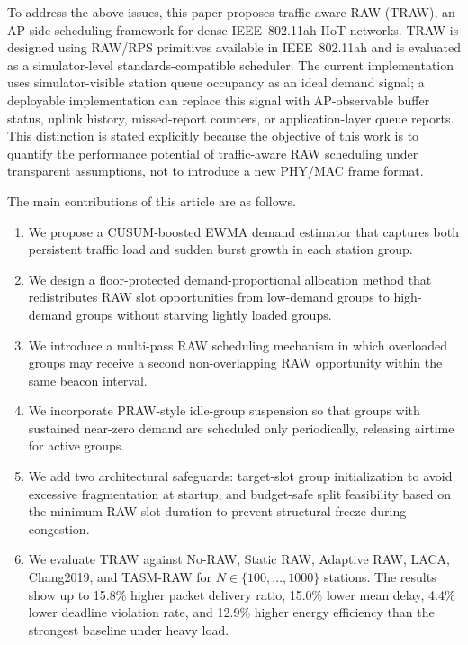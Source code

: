 \documentclass[journal]{IEEEtran}
\begin{document}
To address the above issues, this paper proposes traffic-aware RAW
(TRAW), an AP-side scheduling framework for dense IEEE~802.11ah IIoT
networks. TRAW is designed using RAW/RPS primitives available in
IEEE~802.11ah and is evaluated as a simulator-level standards-compatible
scheduler. The current implementation uses simulator-visible station
queue occupancy as an ideal demand signal; a deployable implementation
can replace this signal with AP-observable buffer status, uplink
history, missed-report counters, or application-layer queue reports.
This distinction is stated explicitly because the objective of this work
is to quantify the performance potential of traffic-aware RAW scheduling
under transparent assumptions, not to introduce a new PHY/MAC frame
format.

The main contributions of this article are as follows.
\begin{enumerate}
  \item We propose a CUSUM-boosted EWMA demand estimator that captures
        both persistent traffic load and sudden burst growth in each
        station group.
  \item We design a floor-protected demand-proportional allocation
        method that redistributes RAW slot opportunities from
        low-demand groups to high-demand groups without starving
        lightly loaded groups.
  \item We introduce a multi-pass RAW scheduling mechanism in which
        overloaded groups may receive a second non-overlapping RAW
        opportunity within the same beacon interval.
  \item We incorporate PRAW-style idle-group suspension so that groups
        with sustained near-zero demand are scheduled only
        periodically, releasing airtime for active groups.
  \item We add two architectural safeguards: target-slot group
        initialization to avoid excessive fragmentation at startup, and
        budget-safe split feasibility based on the minimum RAW slot
        duration to prevent structural freeze during congestion.
  \item We evaluate TRAW against No-RAW, Static RAW, Adaptive RAW,
        LACA, Chang2019, and TASM-RAW for $N\!\in\!\{100,\ldots,1000\}$
        stations.
        The results show up to 15.8\% higher packet delivery ratio,
        15.0\% lower mean delay, 4.4\% lower deadline violation rate,
        and 12.9\% higher energy efficiency than the strongest baseline
        under heavy load.
\end{enumerate}
\end{document}
